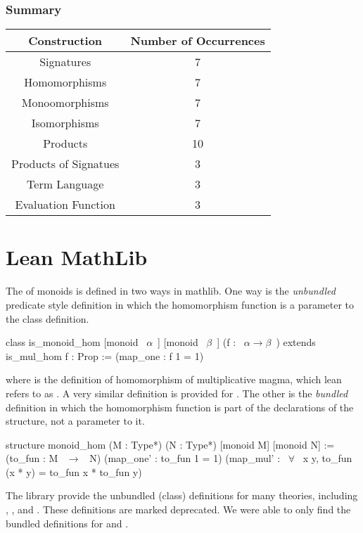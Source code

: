 \subsubsection*{Summary}
\begin{center}
\begin{tabular}{| c || c |}
\hline 
\textbf{Construction} & \textbf{Number of Occurrences} \\ \hline 
Signatures & 7 \\ \hline
Homomorphisms & 7  \\ \hline
Monoomorphisms & 7 \\ \hline
Isomorphisms & 7 \\ \hline
Products & 10 \\ \hline
Products of Signatues & 3 \\ \hline
Term Language & 3 \\ \hline
Evaluation Function & 3 \\ \hline
\end{tabular}
\end{center}

\section{Lean MathLib}
The \href{https://github.com/leanprover-community/mathlib/blob/4bb8d4475f897c8997100d31fe84b33050444374/src/algebra/group/hom.lean}
{} 
of monoids is defined in two ways in mathlib. 
One way is the \emph{unbundled} predicate style definition in which the homomorphism function is a parameter to the class definition.  
\begin{leancode} 
class is_monoid_hom [monoid ~$\alpha$~] [monoid ~$\beta$~] (f : ~$\alpha \to \beta$~) 
   extends is_mul_hom f : Prop :=
    (map_one : f 1 = 1)
\end{leancode} 
\noindent where  is the definition of homomorphism of multiplicative magma, which lean refers to as . A very similar definition is provided for . 
The other is the \emph{bundled} definition in which the homomorphism function is part of the declarations of the structure, not a parameter to it. 
\begin{leancode}     
structure monoid_hom (M : Type*) (N : Type*) [monoid M] [monoid N] :=
  (to_fun : M ~$\to$~ N)
  (map_one' : to_fun 1 = 1)
  (map_mul' : ~$\forall$~ x y, to_fun (x * y) = to_fun x * to_fun y)    
\end{leancode} 
The library provide the unbundled (class) definitions for many theories, including , , and . These definitions are marked deprecated. We were able to only find the bundled definitions for 
\href{https://github.com/leanprover-community/mathlib/blob/4bb8d4475f897c8997100d31fe84b33050444374/src/algebra/group/hom.lean}
{} and 
\href{https://github.com/leanprover-community/mathlib/blob/4bb8d4475f897c8997100d31fe84b33050444374/src/algebra/ring.lean}
{}. 

